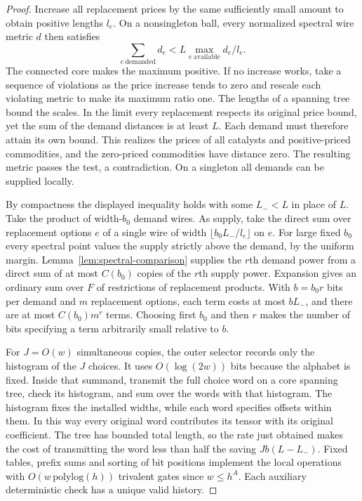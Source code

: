 \begin{proof}
Increase all replacement prices by the same sufficiently small amount
to obtain positive lengths $l_e$. On a nonsingleton ball, every
normalized spectral wire metric $d$ then satisfies
\[
             \sum_{e\ \mathrm{demanded}}d_e
               < L\max_{e\ \mathrm{available}}d_e/l_e .
\]
The connected core makes the maximum positive. If no increase works, take a
sequence of violations as the price increase tends to zero and rescale
each violating metric to make its maximum ratio one. The lengths of
a spanning tree bound the scales. In the limit every replacement
respects its original price bound, yet the sum of the demand distances
is at least $L$. Each demand must therefore attain its own bound.
This realizes the prices of all catalysts and positive-priced commodities,
and the zero-priced commodities have distance zero. The resulting metric
passes the test, a contradiction. On a singleton all demands can be
supplied locally.

By compactness the displayed inequality holds with some $L_-<L$ in
place of $L$. Take the product of width-$b_0$ demand wires. As supply,
take the direct sum over replacement options $e$ of a single wire of
width $\lfloor b_0 L_-/l_e\rfloor$ on $e$. For large fixed $b_0$ every
spectral point values the supply strictly above the demand, by the
uniform margin. Lemma~\ref{lem:spectral-comparison} supplies the $r$th
demand power from a direct sum of at most $C(b_0)$ copies of the $r$th
supply power. Expansion gives an ordinary sum over $F$ of restrictions
of replacement products. With $b=b_0r$ bits per demand and $m$
replacement options, each term costs at most $bL_-$, and there are at
most $C(b_0)m^r$ terms. Choosing first $b_0$ and then $r$ makes the
number of bits specifying a term arbitrarily small relative to $b$.

For $J=O(w)$ simultaneous copies, the outer selector records only the
histogram of the $J$ choices. It uses $O(\log(2w))$ bits because the
alphabet is fixed. Inside that summand, transmit the full choice word
on a core spanning tree, check its histogram, and sum over the words with
that histogram. The histogram fixes the installed widths, while each word
specifies offsets within them. In this way every original word
contributes its tensor with its original coefficient. The tree has
bounded total length, so the rate just obtained makes the cost of
transmitting the word less than half the saving $Jb(L-L_-)$. Fixed
tables, prefix sums and sorting of bit positions implement the local
operations with $O(w\,\mathrm{polylog}(h))$ trivalent gates since
$w\le h^A$. Each auxiliary deterministic check has a unique valid
history.


\end{proof}
